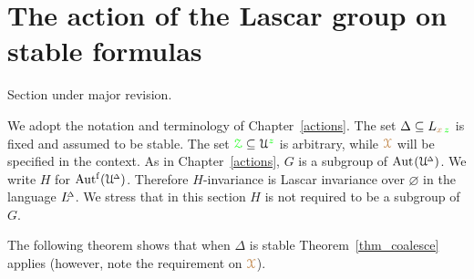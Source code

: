 \section{The action of the Lascar group on stable formulas}\label{Lascar_action}

\def\medrel#1{\parbox[t]{6ex}{$\displaystyle\hfil #1$}}
\def\ceq#1#2#3{\parbox[t]{10ex}{$\displaystyle #1$}\medrel{#2}$\displaystyle  #3$}

\def\DLascar{L\kern-.6ex\raisebox{1.1ex}{\tiny$\Delta$}\kern-.1ex ascar}

\noindent\llap{\textcolor{red}{\Large\warning}\kern1.5ex}\ignorespaces
Section under major revision.

We adopt the notation and terminology of Chapter~\ref{actions}.
The set $\Delta\subseteq L_{{\color{brown} x}\,{\color{green} z}}$ is fixed and assumed to be stable.
The set ${\color{green}\EuScript Z}\subseteq\EuScript U^{\color{green} z}$ is arbitrary, while ${\color{brown}\EuScript X}$ will be specified in the context.
As in Chapter~\ref{actions}, \emph{$G$\/} is a subgroup of ${\rm Aut\kern.15ex}(\EuScript U\kern-.2ex^{\scriptscriptstyle\Delta})$.
We write \emph{$H$\/} for $\mbox{Aut$^{\rm f}$}(\EuScript U\kern-.2ex^{\scriptscriptstyle\Delta})$.
Therefore $H$-invariance is Lascar invariance over $\varnothing$ in the language $L\kern-.5ex^{\scriptscriptstyle\Delta}$.
We stress that in this section $H$ is not required to be a subgroup of $G$.




The following theorem shows that when $\Delta$ is stable Theorem~\ref{thm_coalesce} applies (however, note the requirement on ${\color{brown}\EuScript X}$).

